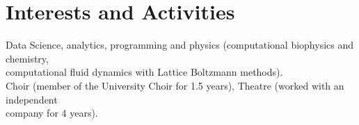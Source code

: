 \documentclass[a4paper,10pt]{article} %
\begin{document}
\color{OrangeRed} 
\section{Interests and Activities}
\color{black}

Data Science, analytics, programming and physics (computational biophysics and chemistry, \\ computational fluid dynamics with Lattice Boltzmann methods). \\
Choir (member of the University Choir for 1.5 years), Theatre (worked with an independent \\ company for 4 years). \\

\end{document}
